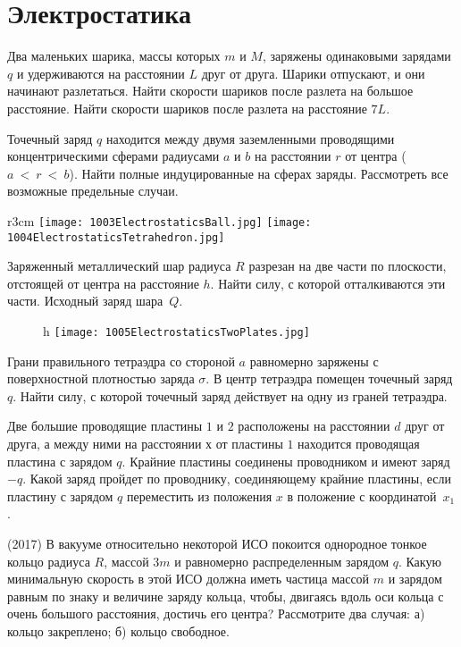 \section{Электростатика}

\AddProb Два маленьких шарика, массы которых $m$ и $M$, заряжены одинаковыми зарядами $q$ и удерживаются на расстоянии $L$ друг от друга. 
Шарики отпускают, и они начинают разлетаться. Найти скорости шариков после разлета на большое расстояние. 
Найти скорости шариков после разлета на расстояние $7L$.

\AddProb Точечный заряд $q$ находится между двумя заземленными проводящими концентрическими сферами 
радиусами $a$ и $b$ на расстоянии $r$ от центра ($a~<~r~<~b$). 
Найти полные индуцированные на сферах заряды. Рассмотреть все возможные предельные случаи.

\begin{wrapfigure}{r}{3cm}
\texttt{[image: 1003ElectrostaticsBall.jpg]}
\texttt{[image: 1004ElectrostaticsTetrahedron.jpg]}
\end{wrapfigure}

\AddProb Заряженный металлический шар радиуса $R$ разрезан на две части по плоскости, отстоящей от центра на расстояние $h$. 
Найти силу, с которой отталкиваются эти части. Исходный заряд шара~$Q$.

\begin{figure}{h}
\texttt{[image: 1005ElectrostaticsTwoPlates.jpg]}
\end{figure}

\AddProb Грани правильного тетраэдра со стороной $a$ равномерно заряжены с поверхностной плотностью заряда $\sigma$. 
В центр тетраэдра помещен точечный заряд $q$. Найти силу, с которой точечный заряд действует на одну из граней тетраэдра.

\AddProb Две большие проводящие пластины $1$ и $2$ расположены на расстоянии $d$ друг от друга, 
а между ними на расстоянии $х$ от пластины $1$ находится проводящая пластина с зарядом $q$. 
Крайние пластины соединены проводником и имеют заряд $-q$. 
Какой заряд пройдет по проводнику, соединяющему крайние пластины, если пластину с зарядом $q$ переместить из положения $x$ в положение с координатой~$x_1$.

\AddProb (2017) В вакууме относительно некоторой ИСО покоится однородное тонкое кольцо радиуса $R$, массой $3m$ и равномерно распределенным зарядом $q$. Какую минимальную скорость в этой ИСО должна иметь частица массой $m$ и зарядом равным по знаку и величине заряду кольца, чтобы, двигаясь вдоль оси кольца с очень большого расстояния, достичь его центра? Рассмотрите два случая: а) кольцо закреплено; б) кольцо свободное.


